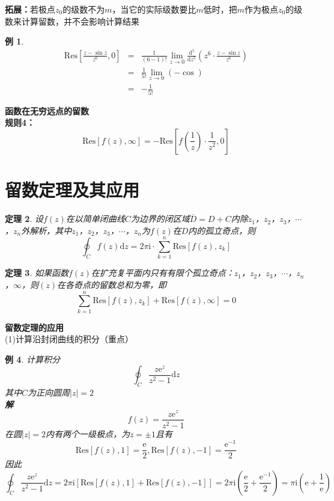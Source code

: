 \documentclass[12pt, a4paper, twoside]{ctexbook}
\newtheorem{theorem}{定理}[section]
\newtheorem{example}[theorem]{例}
\begin{document}
\textbf{拓展：}若极点$z_0$的级数不为$m$，当它的实际级数要比$m$低时，把$m$作为极点$z_0$的级数来计算留数，并不会影响计算结果
\begin{example}
    \begin{eqnarray}
        \mathrm{Res}\left[\frac{z-\sin z}{z^6},0\right]&=&\frac{1}{\left(6-1\right)!}\lim_{z\to 0}{\frac{\mathrm{d^5}}{\mathrm{d}z^5}\left(z^6\cdot\frac{z-\sin z}{z^6}\right)} \nonumber      \\
        ~&=&\frac{1}{5!}\lim_{z\to 0}\left(-\cos \right) \nonumber    \\
		~&=&-\frac{1}{5!} \nonumber
    \end{eqnarray}
\end{example}
\textbf{函数在无穷远点的留数}\\
\hspace*{2em}\textbf{规则4：}
$$
\mathrm{Res}\left[f\left(z\right),\infty\right]=-\mathrm{Res}\left[f\left(\frac{1}{z}\right)\cdot\frac{1}{z^2},0\right]
$$
\newpage
\section{留数定理及其应用}
\begin{theorem}
	设$f\left(z\right)$在以简单闭曲线$C$为边界的闭区域$\overline{D}=D+C$内除$z_1$，$z_2$，$z_3$，$\cdots$，$z_n$外解析，其中$z_1$，$z_2$，$z_3$，$\cdots$，$z_n$为$f\left(z\right)$在$D$内的孤立奇点，则
	$$
	\oint_C{f\left(z\right)\mathrm{d}z}=2\pi\mathrm{i}\cdot\sum_{k=1}^{n}{\mathrm{Res}\left[f\left(z\right),z_k\right]}
	$$
\end{theorem}
\begin{theorem}
	如果函数$f\left(z\right)$在扩充复平面内只有有限个孤立奇点：$z_1$，$z_2$，$z_3$，$\cdots$，$z_n$，$\infty$，则$\left(z\right)$在各奇点的留数总和为零，即
	$$
	\sum_{k=1}^{n}{\mathrm{Res}\left[f\left(z\right),z_k\right]}+\mathrm{Res}\left[f\left(z\right),\infty\right]=0
	$$
\end{theorem}
\textbf{留数定理的应用}\\
(1)计算沿封闭曲线的积分（重点）
\begin{example}
	计算积分
	$$
	\oint_C{\frac{z\mathrm{e}^z}{z^2-1}\mathrm{d}z}
	$$
	\hspace*{2em}其中$C$为正向圆周$\left|z\right|=2$\\
	\hspace*{1em}\textbf{解}\\
	\hspace*{2em}
	$$
	f\left(z\right)=\frac{z\mathrm{e}^z}{z^2-1}
	$$
	\hspace*{2em}在圆$\left|z\right|=2$内有两个一级极点，为$z=\pm \mathrm{1}$且有
	$$
	\mathrm{Res}\left[f\left(z\right),1\right]=\frac{\mathrm{e}}{2},\mathrm{Res}\left[f\left(z\right),-1\right]=\frac{\mathrm{e}^{-1}}{2}
	$$
	\hspace*{2em}因此
	$$
	\oint_C{\frac{z\mathrm{e}^z}{z^2-1}\mathrm{d}z}=2\pi\mathrm{i}\left[\mathrm{Res}\left[f\left(z\right),1\right]+\mathrm{Res}\left[f\left(z\right),-1\right]\right]=2\pi\mathrm{i}\left(\frac{\mathrm{e}}{2}+\frac{\mathrm{e}^{-1}}{2}\right)=\pi\mathrm{i}\left(\mathrm{e}+\frac{1}{\mathrm{e}}\right)
	$$
\end{example}
\newpage
\end{document}
